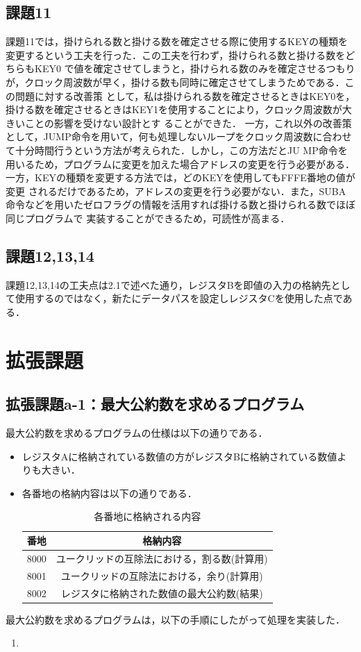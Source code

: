 \documentclass[dvipdfmx]{jarticle}
\begin{document}
\subsection{課題11}
課題11では，掛けられる数と掛ける数を確定させる際に使用するKEYの種類を変更するという工夫を行った．この工夫を行わず，掛けられる数と掛ける数をどちらもKEY0
で値を確定させてしまうと，掛けられる数のみを確定させるつもりが，クロック周波数が早く，掛ける数も同時に確定させてしまうためである．この問題に対する改善策
として，私は掛けられる数を確定させるときはKEY0を，掛ける数を確定させるときはKEY1を使用することにより，クロック周波数が大きいことの影響を受けない設計とす
ることができた．
一方，これ以外の改善策として，JUMP命令を用いて，何も処理しないループをクロック周波数に合わせて十分時間行うという方法が考えられた．しかし，この方法だとJU
MP命令を用いるため，プログラムに変更を加えた場合アドレスの変更を行う必要がある．一方，KEYの種類を変更する方法では，どのKEYを使用してもFFFE番地の値が変更
されるだけであるため，アドレスの変更を行う必要がない．また，SUBA命令などを用いたゼロフラグの情報を活用すれば掛ける数と掛けられる数でほぼ同じプログラムで
実装することができるため，可読性が高まる．
\subsection{課題12,13,14}
課題12,13,14の工夫点は2.1で述べた通り，レジスタBを即値の入力の格納先として使用するのではなく，新たにデータパスを設定しレジスタCを使用した点である．
\section{拡張課題}
\subsection{拡張課題a-1：最大公約数を求めるプログラム}
最大公約数を求めるプログラムの仕様は以下の通りである．
\begin{itemize}
  \item レジスタAに格納されている数値の方がレジスタBに格納されている数値よりも大きい．
  \item 各番地の格納内容は以下の通りである．
  \begin{table}[h]
    \centering
    \begin{tabular}{|c|c|}
      \hline
      番地 & 格納内容\\\hline\hline
      8000 & ユークリッドの互除法における，割る数(計算用)\\\hline
      8001 & ユークリッドの互除法における，余り(計算用)\\\hline
      8002 & レジスタに格納された数値の最大公約数(結果)\\\hline
    \end{tabular}
    \caption{各番地に格納される内容}
  \end{table}
\end{itemize}
最大公約数を求めるプログラムは，以下の手順にしたがって処理を実装した．
\begin{enumerate}
  \item 
\end{enumerate}
\end{document}
